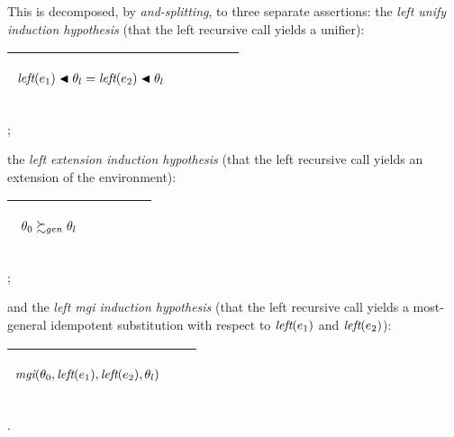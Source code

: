 \documentclass[runningheads]{llncs}
\DeclareMathOperator{\lef}{\emph{left}}
\DeclareMathOperator{\mgi}{\emph{mgi}}
\begin{document}
This is decomposed, by \emph{and-splitting}, to three separate assertions:
the \emph{left unify induction hypothesis} (that the left recursive call yields a unifier):
  \begin{center}
  \begin{tabular}{|m{}|m{}||m{}|}
\hline
\begin{center}
{$\begin{aligned}
 &\begin{aligned}
 &\begin{aligned}
&\lef(\e{1}) \apply \thet{l} = 
\lef(\e{2}) \apply \thet{l} 
\end{aligned}
\end{aligned}\end{aligned}   $} 
\end{center}& &  \\  \hline
\end{tabular};
\end{center}
 the \emph{left extension induction hypothesis} (that the left recursive call yields an extension of the environment):
  \begin{center}
  \begin{tabular}{|m{}|m{}||m{}|}
\hline
\begin{center}
{$\begin{aligned}
 &\begin{aligned}
 &\begin{aligned}
 \,\, &\, \theta_{0} \succsim_{gen} \theta_{l} 
\end{aligned}
\end{aligned}\end{aligned}   $} 
\end{center}& &  \\  \hline
\end{tabular};
\end{center}
 and the \emph{left mgi induction hypothesis} (that the left recursive call yields a most-general idempotent substitution with respect to $\lef(\e{1})$ and $\lef(\e{2})$):


\begin{center}
  \begin{tabular}{|m{}|m{}||m{}|}
\hline
\begin{center}
{$
\begin{aligned}
 \mgi(\thet{0}, \lef(\e{1}), \lef(\e{2}), \thet{l})
\end{aligned} $}  \hspace{0cm} 
\end{center}& &  \\  \hline
\end{tabular}
\end{center}
.
 
\end{document}
